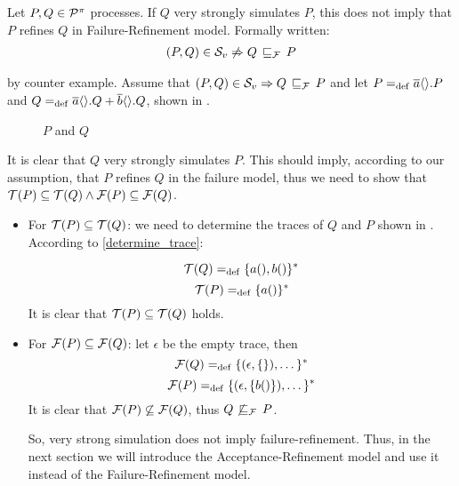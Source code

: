 \begin{cor}
\label{cor_sim_failure_refinement}
Let $P,Q\in\mathcal P^{\pi}$ processes. If $Q$ very strongly simulates $P$, this does not imply that $P$ refines $Q$ in Failure-Refinement model. Formally written:
\begin{align}
    (P,Q)\in{}\simuv  \not\Rightarrow Q \refiF P
   \label{failure_model}
\end{align}
\end{cor}%
\begin{prf}
by counter example. Assume that $(P,Q)\in{}\simuv \Rightarrow Q \refiF P$ and let $P=_{\mathrm{def}}\overline{a}\langle\rangle.P$ and $Q=_{\mathrm{def}}\overline{a}\langle\rangle.Q + \overline{b}\langle\rangle.Q$, shown in .
\begin{figure}[H]%
\centering
{}%
\qquad
{}%
\caption{$P$ and $Q$}
\label{vm_and_vmHalf}
\end{figure}

It is clear that $Q$ very strongly simulates $P$. This should imply, according to our assumption, that $P$ refines $Q$ in the failure model, thus we need to show that $\Traces[P]\subseteq\Traces[Q] \wedge \Failures[P]\subseteq\Failures[Q]$.
\begin{itemize}
\item For $\Traces[P]\subseteq\Traces[Q]$: we need to determine the traces of $Q$ and $P$  shown in . According to \ref{determine_trace}:

    \[\Traces[Q] \define \{a(),b()\}^\ast\]
    \[\Traces[P] \define \{a()\}^\ast\]
It is clear that $\Traces[P]\subseteq\Traces[Q]$ holds. 

\item For $\Failures[P]\subseteq\Failures[Q]$: let $\epsilon$ be the empty trace, then
    \[\Failures[Q] \define \{(\epsilon,\{\}),\dots\}^\ast\]
    \[\Failures[P] \define \{(\epsilon,\{b()\}),\dots\}^\ast\]
It is clear that $\Failures[P]\not\subseteq\Failures[Q]$, thus $Q \not\refiF P$.

So, very strong simulation does not imply failure-refinement. Thus, in the next section we will introduce the Acceptance-Refinement model and use it instead of the Failure-Refinement model.
\end{itemize}
\end{prf}
